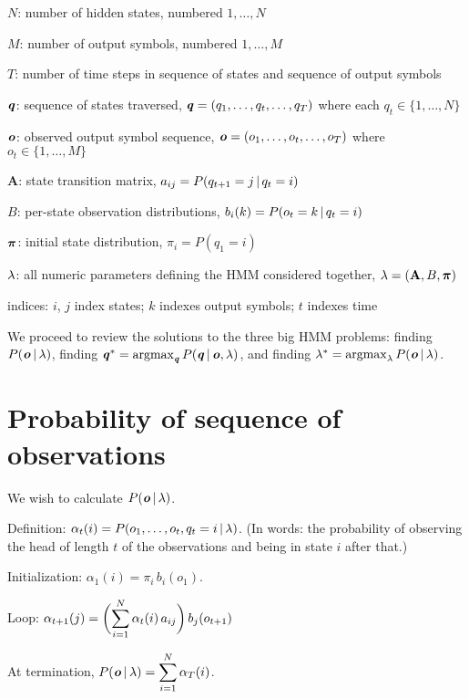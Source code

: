 \begin{compactdesc}
\item[$N$:] number of hidden states, numbered $1,\ldots,N$
\item[$M$:] number of output symbols, numbered $1,\ldots,M$
\item[$T$:] number of time steps in sequence of states and sequence of
  output symbols
\item[$\boldsymbol{\mathit{q}}$:] sequence of states traversed, $\boldsymbol{\mathit{q}} = (q_1,
  \ldots, q_t, \ldots, q_T)$ where each $q_t \in \{1,\ldots,N\}$
\item[$\boldsymbol{\mathit{o}}$:] observed output symbol sequence, $\boldsymbol{\mathit{o}} = (o_1,
  \ldots, o_t, \ldots, o_T)$ where $o_t \in \{1,\ldots,M\}$
\item[$\mathbf{A}$:] state transition matrix,
  $a_{ij} = P(q_{t+1} = j \operatorname*{\vert} q_t = i)$
\item[$B$:] per-state observation distributions,
  $b_i(k) = P(o_t = k \operatorname*{\vert} q_t = i)$
\item[$\boldsymbol{\mathit{\pi}}$:] initial state distribution, $\pi_i = P(q_1 = i)$
\item[$\lambda$:] all numeric parameters defining the HMM considered
  together, $\lambda = (\mathbf{A}, B, \boldsymbol{\mathit{\pi}})$
\item[indices:] $i$, $j$ index states; $k$ indexes output symbols; $t$
  indexes time
\end{compactdesc}

We proceed to review the solutions to the three big HMM problems:
finding $P(\boldsymbol{\mathit{o}} \operatorname*{\vert} \lambda)$, finding $\vv{q}^* = \argmax_{\vv{q}}
P(\vv{q} \given \vv{o}, \lam)$, and finding $\lam^* = \argmax_{\lam}
P(\vv{o} \given \lam)$.

\section{Probability of sequence of observations}

We wish to calculate $P(\boldsymbol{\mathit{o}} \operatorname*{\vert} \lambda)$.

Definition: $\alpha_t(i) = P(o_1, \ldots,o_t,q_t=i \operatorname*{\vert} \lambda)$.
(In words: the probability of observing the head of length $t$ of the
observations and being in state $i$ after that.)

Initialization:
$\alpha_1(i) = \pi_i \, b_i(o_1)$.

Loop:
$\alpha_{t+1}(j)
= \biggl( \displaystyle\sum_{i=1}^N \alpha_t(i) \, a_{ij} \biggr) \, b_j(o_{t+1})$

At termination, $P(\boldsymbol{\mathit{o}} \operatorname*{\vert} \lambda) = \displaystyle\sum_{i=1}^N \alpha_T(i)$.

